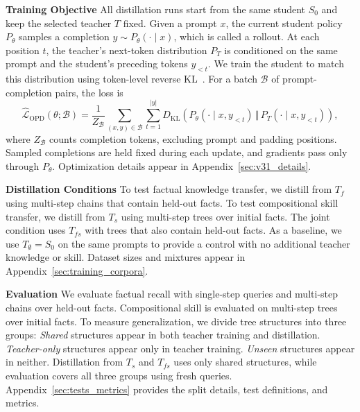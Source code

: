 \documentclass[]{template}
\theoremstyle{plain}
\theoremstyle{definition}
\theoremstyle{remark}
\renewcommand{\paragraph}[1]{\vspace{1mm}\noindent\textbf{#1}}
\begin{document}
\paragraph{Training Objective}
\label{sec:distillation_framework}
All distillation runs start from the same student $S_0$ and keep the selected teacher $T$ fixed. Given a prompt $x$, the current student policy $P_\theta$ samples a completion $y\sim P_\theta(\cdot\mid x)$, which is called a rollout. At each position $t$, the teacher's next-token distribution $P_T$ is conditioned on the same prompt and the student's preceding tokens $y_{<t}$. We train the student to match this distribution using token-level reverse KL~\citep{agarwal2024policy,gu2024minillm}. For a batch $\mathcal{B}$ of prompt-completion pairs, the loss is
\begin{equation}
    \widehat{\mathcal{L}}_{\mathrm{OPD}}(\theta;\mathcal{B})
    =\frac{1}{Z_{\mathcal{B}}}
    \sum_{(x,y)\in\mathcal{B}}\sum_{t=1}^{|y|}
    D_{\mathrm{KL}}\!\left(
    P_\theta(\cdot\mid x,y_{<t})\,\Vert\,P_T(\cdot\mid x,y_{<t})
    \right),
    \label{eq:opd_objective}
\end{equation}
where $Z_{\mathcal{B}}$ counts completion tokens, excluding prompt and padding positions. Sampled completions are held fixed during each update, and gradients pass only through $P_\theta$. Optimization details appear in Appendix~\ref{sec:v31_details}.

\paragraph{Distillation Conditions}
To test factual knowledge transfer, we distill from \(T_f\) using multi-step chains that contain held-out facts. To test compositional skill transfer, we distill from \(T_s\) using multi-step trees over initial facts. The joint condition uses \(T_{fs}\) with trees that also contain held-out facts. As a baseline, we  use $T_\emptyset=S_0$ on the same prompts to provide a control with no additional teacher knowledge or skill. Dataset sizes and mixtures appear in Appendix~\ref{sec:training_corpora}.

\paragraph{Evaluation}
We evaluate factual recall with single-step queries and multi-step chains over held-out facts. Compositional skill is evaluated on multi-step trees over initial facts. To measure generalization, we divide tree structures into three groups:  \emph{Shared} structures appear in both teacher training and distillation. \emph{Teacher-only} structures appear only in teacher training. \emph{Unseen} structures appear in neither. 
Distillation from \(T_s\) and \(T_{fs}\) uses only shared structures, while evaluation covers all three groups using fresh queries.
Appendix~\ref{sec:tests_metrics} provides the split details, test definitions, and metrics.
\end{document}
